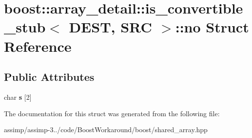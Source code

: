 \hypertarget{structboost_1_1array__detail_1_1is__convertible__stub_1_1no}{\section{boost\+:\+:array\+\_\+detail\+:\+:is\+\_\+convertible\+\_\+stub$<$ D\+E\+S\+T, S\+R\+C $>$\+:\+:no Struct Reference}
\label{structboost_1_1array__detail_1_1is__convertible__stub_1_1no}
}
\subsection*{Public Attributes}
\begin{DoxyCompactItemize}
\item 
\hypertarget{structboost_1_1array__detail_1_1is__convertible__stub_1_1no_a9de604dfe6ab8fea0f7eeb7b1f5cfffa}{char {\bfseries s} \mbox{[}2\mbox{]}}\label{structboost_1_1array__detail_1_1is__convertible__stub_1_1no_a9de604dfe6ab8fea0f7eeb7b1f5cfffa}

\end{DoxyCompactItemize}


The documentation for this struct was generated from the following file\+:\begin{DoxyCompactItemize}
\item 
assimp/assimp-\/3../code/\+Boost\+Workaround/boost/shared\+\_\+array.\+hpp\end{DoxyCompactItemize}
